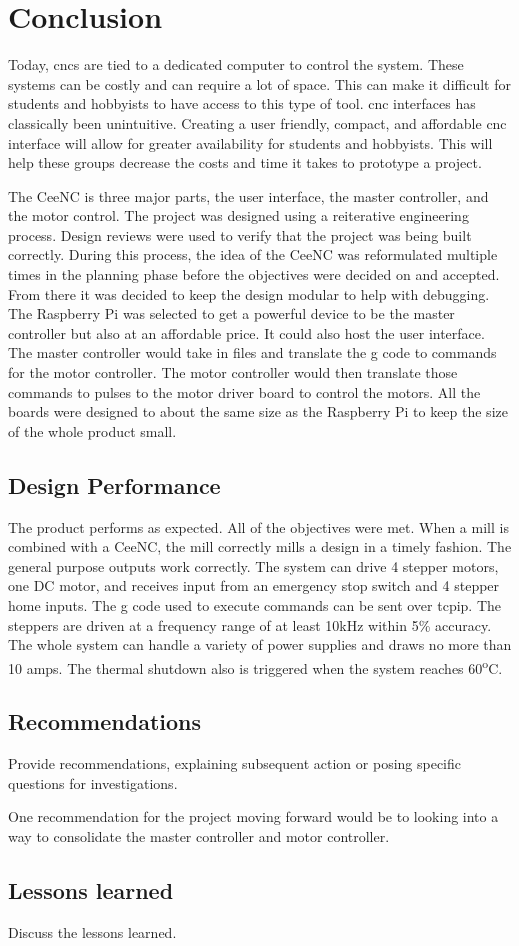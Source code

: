 \chapter{Conclusion}

Today, \gls{cnc}s are tied to a dedicated computer to control the system.
These systems can be costly and can require a lot of space.
This can make it difficult for students and hobbyists to have access to this type of tool.
\gls{cnc} interfaces has classically been unintuitive.
Creating a user friendly, compact, and affordable \gls{cnc} interface will allow for greater availability for students and hobbyists.
This will help these groups decrease the costs and time it takes to prototype a project.

The CeeNC is three major parts, the user interface, the master controller, and the motor control.
The project was designed using a reiterative engineering process.
Design reviews were used to verify that the project was being built correctly.
During this process, the idea of the CeeNC was reformulated multiple times in the planning phase before the objectives were decided on and accepted.
From there it was decided to keep the design modular to help with debugging.
The Raspberry Pi was selected to get a powerful device to be the master controller but also at an affordable price.
 It could also host the user interface.
The master controller would take in files and translate the g code to commands for the motor controller.
The motor controller would then translate those commands to pulses to the motor driver board to control the motors.
All the boards were designed to about the same size as the Raspberry Pi to keep the size of the whole product small.


\section{Design Performance}

The product performs as expected.
All of the objectives were met.
When a mill is combined with a CeeNC, the mill correctly mills a design in a timely fashion. 
The general purpose outputs work correctly.
The system can drive 4 stepper motors, one DC motor, and receives input from an emergency stop switch and 4 stepper home inputs.
The g code used to execute commands can be sent over \gls{tcpip}.
The steppers are driven at a frequency range of at least 10kHz within 5\% accuracy.
The whole system can handle a variety of power supplies and draws no more than 10 amps.
The thermal shutdown also is triggered when the system reaches 60\textsuperscript{o}C.
\section{Recommendations}
Provide recommendations, explaining subsequent action or posing specific questions for investigations. 

One recommendation for the project moving forward would be to looking into a way to consolidate the master controller and motor controller.

\section{Lessons learned}
Discuss the lessons learned. 
